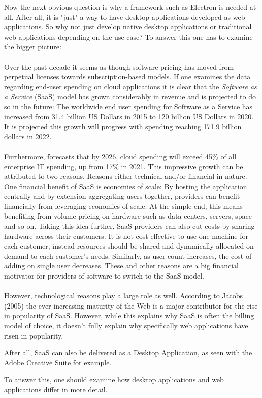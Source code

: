 Now the next obvious question is why a framework such as Electron is needed at all.
After all, it is "just" a way to have desktop applications developed as web applications.
So why not just develop native desktop applications or traditional web applications depending on the use case?
To answer this one has to examine the bigger picture:\paragraph{}
Over the past decade it seems as though software pricing has moved from perpetual licenses towards subscription-based
models.
If one examines the data regarding end-user spending on cloud applications it is clear that the
\emph{Software as a Service} (SaaS) model has grown considerably in revenue and is projected to do so in the future:
The worldwide end user spending for Software as a Service has increased from 31.4 billion US Dollars in 2015 to 120
billion US Dollars in 2020.
It is projected this growth will progress with spending reaching 171.9 billion dollars in 2022. \parencite{gartner2021}\paragraph{}
Furthermore, \textcite{gartner2021} forecasts that by 2026, cloud spending will exceed 45\% of all enterprise IT spending, up from
17\% in 2021.
This impressive growth can be attributed to two reasons.
Reasons either technical and/or financial in nature.
One financial benefit of SaaS is economies of scale:
By hosting the application centrally and by extension aggregating users together, providers can benefit financially from
leveraging economies of scale.
At the simple end, this means benefiting from volume pricing on hardware such as data centers, servers, space and so on.
Taking this idea further, SaaS providers can also cut costs by sharing hardware across their customers.
It is not cost-effective to use one machine for each customer, instead resources should be shared and dynamically
allocated on-demand to each customer's needs.
Similarly, as user count increases, the cost of adding on single user decreases.
These and other reasons are a big financial motivator for providers of software to switch to the SaaS model.\paragraph{}
However, technological reasons play a large role as well.
According to Jacobs (2005) the ever-increasing maturity of the Web is a major contributor for the rise in popularity of
SaaS\@.
However, while this explains why SaaS is often the billing model of choice, it doesn't fully explain why specifically web applications
have risen in popularity. \parencite{statista2021}\par
After all, SaaS can also be delivered as a Desktop Application, as seen with the Adobe Creative Suite for example. \parencite{adobe2021}\par
To answer this, one should examine how desktop applications and web applications differ in more detail.

